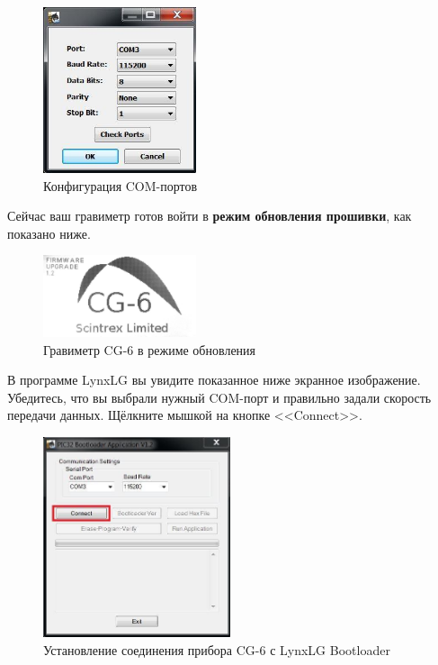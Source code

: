 \begin{figure}[H]
  \centering
  \includegraphics[width=0.4\textwidth]{figures/com_port_configuration}
  \caption{Конфигурация COM-портов}
  \label{fig:com_port_configuration}
\end{figure}

Сейчас ваш гравиметр \cg{} готов войти в \textbf{режим обновления прошивки}, как
показано ниже.

\begin{figure}[H]
  \centering
  \includegraphics[width=0.4\textwidth]{figures/the_cg6_in_upgrade_mode}
  \caption{Гравиметр CG-6 в режиме обновления}
  \label{fig:the_cg6_in_upgrade_mode}
\end{figure}


В программе LynxLG вы увидите показанное ниже экранное изображение. Убедитесь,
что вы выбрали нужный COM-порт и правильно задали скорость передачи данных.
Щёлкните мышкой на кнопке <<Connect>>.

\begin{figure}[H]
  \centering
  \includegraphics[width=0.49\textwidth]{figures/connecting_the_cg6_with_lynxlg_bootloader}
  \caption{Установление соединения прибора CG-6 с LynxLG Bootloader}
  \label{fig:connecting_the_cg6_with_lynxlg_bootloader}
\end{figure}

